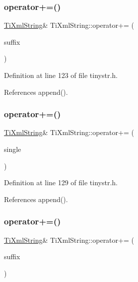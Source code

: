 \subsubsection{\texorpdfstring{operator+=()}{operator+=()}\hspace{0.1cm}{\footnotesize\ttfamily [1/3]}}
{\footnotesize\ttfamily \hyperlink{class_ti_xml_string}{Ti\+Xml\+String}\& Ti\+Xml\+String\+::operator+= (\begin{DoxyParamCaption}\item[{const char $\ast$}]{suffix }\end{DoxyParamCaption})\hspace{0.3cm}{\ttfamily [inline]}}



Definition at line 123 of file tinystr.\+h.



References append().

\hypertarget{class_ti_xml_string_a6aa09d5240470b76d54ec709e04f8c13}{}\label{class_ti_xml_string_a6aa09d5240470b76d54ec709e04f8c13} 
\subsubsection{\texorpdfstring{operator+=()}{operator+=()}\hspace{0.1cm}{\footnotesize\ttfamily [2/3]}}
{\footnotesize\ttfamily \hyperlink{class_ti_xml_string}{Ti\+Xml\+String}\& Ti\+Xml\+String\+::operator+= (\begin{DoxyParamCaption}\item[{char}]{single }\end{DoxyParamCaption})\hspace{0.3cm}{\ttfamily [inline]}}



Definition at line 129 of file tinystr.\+h.



References append().

\hypertarget{class_ti_xml_string_afdcae5ea2b4d9e194dc21226b817f417}{}\label{class_ti_xml_string_afdcae5ea2b4d9e194dc21226b817f417} 
\subsubsection{\texorpdfstring{operator+=()}{operator+=()}\hspace{0.1cm}{\footnotesize\ttfamily [3/3]}}
{\footnotesize\ttfamily \hyperlink{class_ti_xml_string}{Ti\+Xml\+String}\& Ti\+Xml\+String\+::operator+= (\begin{DoxyParamCaption}\item[{const \hyperlink{class_ti_xml_string}{Ti\+Xml\+String} \&}]{suffix }\end{DoxyParamCaption})\hspace{0.3cm}{\ttfamily [inline]}}



